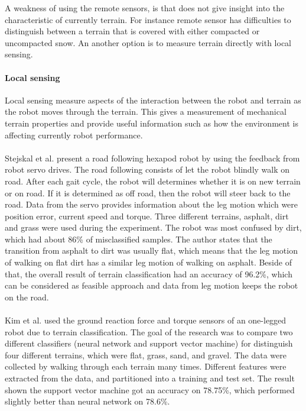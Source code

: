 \documentclass[USenglish]{ifimaster}  %
\begin{document}
A weakness of using the remote sensors, is that does not give insight into the characteristic of currently terrain. For instance remote sensor has difficulties to distinguish between a terrain that is covered with either compacted or uncompacted snow. An another option is to measure terrain directly with local sensing. 

\paragraph{Local sensing}
Local sensing measure aspects of the interaction between the robot and terrain as the robot moves through the terrain. This gives a measurement of mechanical terrain properties and provide useful information such as how the environment is affecting currently robot performance. 
\\
\\ 
Stejskal et al. \cite{7487544} present a road following hexapod robot by using the feedback from robot servo drives. The road following consists of let the robot blindly walk on road. After each gait cycle, the robot will determines whether it is on new terrain or on road. If it is determined as off road, then the robot will steer back to the road. Data from the servo provides information about the leg motion which were position error, current speed and torque. Three different terrains, asphalt, dirt and grass were used during the experiment. The robot was most confused by dirt, which had about 86\% of misclassified samples. The author states that the transition from asphalt to dirt was usually flat, which means that the leg motion of walking on flat dirt has a similar leg motion of walking on asphalt. Beside of that, the overall result of terrain classification had an accuracy of 96.2\%, which can be considered as feasible approach and data from leg motion keeps the robot on the road.
\\
\\
Kim et al. \cite{5602459} used the ground reaction force and torque sensors of an one-legged robot due to terrain classification. The goal of the research was to compare two different classifiers (neural network and support vector machine) for distinguish four different terrains, which were flat, grass, sand, and gravel. The data were collected by walking through each terrain many times. Different features were extracted from the data, and partitioned into a training and test set. The result shown the support vector machine got an accuracy on 78.75\%, which performed slightly better than neural network on 78.6\%.
\end{document}
